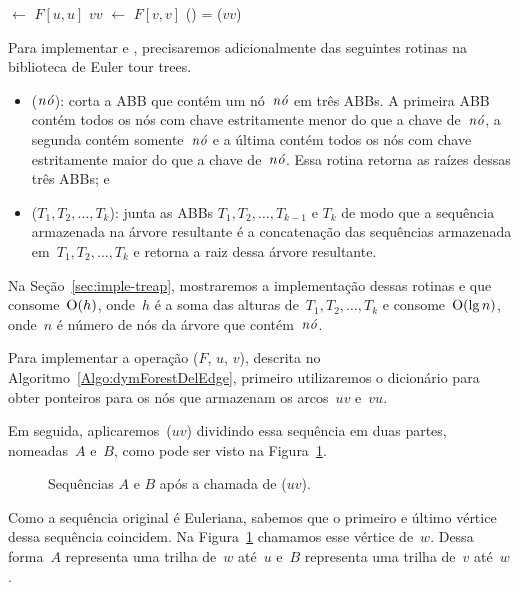 \begin{algorithm}[htb]
\caption{\dymForestQuery($F$, $u$, $v$)}
\label{Algo:dymForestQuery}
\begin{algorithmic}[1]
\State {} $\gets$ $F[u,u]$
\State $vv$ $\gets$ $F[v,v]$
\State \Return \treapGetRoot() = \treapGetRoot($vv$)
\end{algorithmic}
\end{algorithm}

Para implementar \dymForestAddEdge{} e \dymForestDelEdge{}, precisaremos adicionalmente das seguintes rotinas na biblioteca de Euler tour trees. 
\begin{itemize}
\item \treapSplit($\mathit{n\acute{o}}$): corta a ABB que contém um nó~$\mathit{n\acute{o}}$ em três ABBs. A primeira ABB contém todos os nós com chave estritamente menor do que a chave de~$\mathit{n\acute{o}}$, a segunda contém somente~$\mathit{n\acute{o}}$ e a última contém todos os nós com chave estritamente maior do que a chave de~$\mathit{n\acute{o}}$. Essa rotina retorna as raízes dessas três ABBs; e
\item \treapJoin($T_1, T_2, \ldots, T_k$): junta as ABBs $T_1, T_2, \ldots, T_{k-1}$ e $T_k$ de modo que a sequência armazenada na árvore resultante é a concatenação das sequências armazenada em~$T_1, T_2, \ldots, T_k$ e retorna a raiz dessa árvore resultante.
\end{itemize}

Na Seção~\ref{sec:imple-treap}, mostraremos a implementação dessas rotinas e que~\treapJoin{} consome~$\mathrm{O}(h)$, onde~$h$ é a soma das alturas de~$T_1, T_2, \ldots, T_k$ e \treapSplit{} consome~$\mathrm{O}(\lg n)$, onde~$n$ é número de nós da árvore que contém~$\mathit{n\acute{o}}$.

Para implementar a operação \dymForestDelEdge($F$, $u$, $v$), descrita no Algoritmo~\ref{Algo:dymForestDelEdge}, 
primeiro utilizaremos o dicionário para obter ponteiros para os nós que armazenam os arcos~$uv$ e~$vu$.

Em seguida, aplicaremos~\treapSplit($uv$) dividindo essa sequência em duas partes, nomeadas~$A$ e~$B$, como pode ser visto na Figura~\ref{fig:algorit-cut-seqxy}.
\begin{figure}[htb]
\centering

\caption{Sequências $A$ e $B$ após a chamada de \treapSplit($uv$).}
\label{fig:algorit-cut-seqxy}
\end{figure}

Como a sequência original é Euleriana, sabemos que o primeiro e último vértice dessa sequência coincidem. Na Figura~\ref{fig:algorit-cut-seqxy} chamamos esse vértice de~$w$.
Dessa forma~$A$ representa uma trilha de~$w$ até~$u$ e~$B$ representa uma trilha de~$v$ até~$w$.

